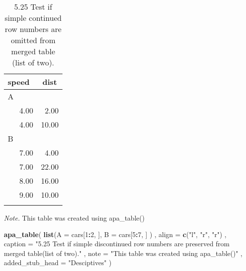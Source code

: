 \documentclass[english,man]{apa6}
\newenvironment{Shaded}{\begin{snugshade}}{\end{snugshade}}
\newcommand{\DataTypeTok}[1]{\textcolor[rgb]{0.13,0.29,0.53}{#1}}
\newcommand{\DecValTok}[1]{\textcolor[rgb]{0.00,0.00,0.81}{#1}}
\newcommand{\KeywordTok}[1]{\textcolor[rgb]{0.13,0.29,0.53}{\textbf{#1}}}
\newcommand{\NormalTok}[1]{#1}
\newcommand{\OperatorTok}[1]{\textcolor[rgb]{0.81,0.36,0.00}{\textbf{#1}}}
\newcommand{\StringTok}[1]{\textcolor[rgb]{0.31,0.60,0.02}{#1}}
\begin{document}
\begin{table}[tbp]

\begin{center}
\begin{threeparttable}

\caption{\label{tab:unnamed-chunk-11}5.25 Test if simple continued row numbers are omitted from merged table (list of two).}

\begin{tabular}{lr}
\toprule
speed & \multicolumn{1}{c}{dist}\\
\midrule
A & \\
\ \ \ 4.00 & 2.00\\
\ \ \ 4.00 & 10.00\\
B & \\
\ \ \ 7.00 & 4.00\\
\ \ \ 7.00 & 22.00\\
\ \ \ 8.00 & 16.00\\
\ \ \ 9.00 & 10.00\\
\bottomrule
\addlinespace
\end{tabular}

\begin{tablenotes}[para]
\normalsize{\textit{Note.} This table was created using apa\_table()}
\end{tablenotes}

\end{threeparttable}
\end{center}

\end{table}

\begin{Shaded}
\begin{Highlighting}[]
\KeywordTok{apa_table}\NormalTok{(}
  \KeywordTok{list}\NormalTok{(}\DataTypeTok{A =}\NormalTok{ cars[}\DecValTok{1}\OperatorTok{:}\DecValTok{2}\NormalTok{, ], }\DataTypeTok{B =}\NormalTok{ cars[}\DecValTok{5}\OperatorTok{:}\DecValTok{7}\NormalTok{, ]}
\NormalTok{      )}
\NormalTok{  , }\DataTypeTok{align =} \KeywordTok{c}\NormalTok{(}\StringTok{"l"}\NormalTok{, }\StringTok{"r"}\NormalTok{, }\StringTok{"r"}\NormalTok{)}
\NormalTok{  , }\DataTypeTok{caption =} \StringTok{"5.25 Test if simple discontinued row numbers are preserved from merged table(list of two)."}
\NormalTok{  , }\DataTypeTok{note =} \StringTok{"This table was created using apa_table()"}
\NormalTok{  , }\DataTypeTok{added_stub_head =} \StringTok{"Desciptives"}
\NormalTok{)}
\end{Highlighting}
\end{Shaded}
\end{document}
